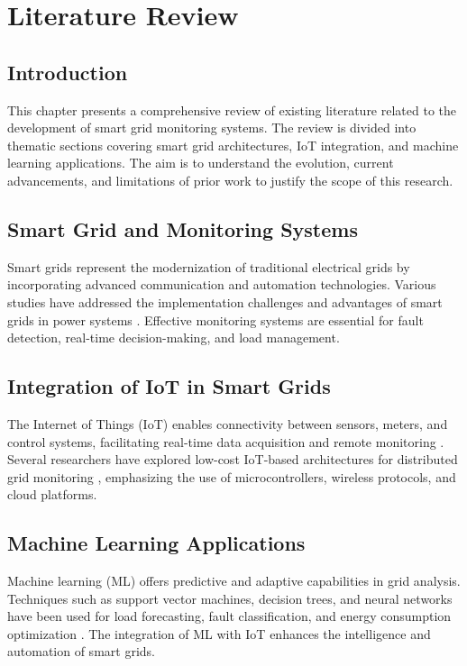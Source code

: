 
\chapter{Literature Review}

\section{Introduction}
This chapter presents a comprehensive review of existing literature related to the development of smart grid monitoring systems. The review is divided into thematic sections covering smart grid architectures, IoT integration, and machine learning applications. The aim is to understand the evolution, current advancements, and limitations of prior work to justify the scope of this research.

\section{Smart Grid and Monitoring Systems}
Smart grids represent the modernization of traditional electrical grids by incorporating advanced communication and automation technologies. Various studies have addressed the implementation challenges and advantages of smart grids in power systems \cite{ieee2030,fang2012smart}. Effective monitoring systems are essential for fault detection, real-time decision-making, and load management.

\section{Integration of IoT in Smart Grids}
The Internet of Things (IoT) enables connectivity between sensors, meters, and control systems, facilitating real-time data acquisition and remote monitoring \cite{zanella2014internet}. Several researchers have explored low-cost IoT-based architectures for distributed grid monitoring \cite{ghosh2017iot}, emphasizing the use of microcontrollers, wireless protocols, and cloud platforms.

\section{Machine Learning Applications}
Machine learning (ML) offers predictive and adaptive capabilities in grid analysis. Techniques such as support vector machines, decision trees, and neural networks have been used for load forecasting, fault classification, and energy consumption optimization \cite{mohamed2019machine, singh2020review}. The integration of ML with IoT enhances the intelligence and automation of smart grids.

